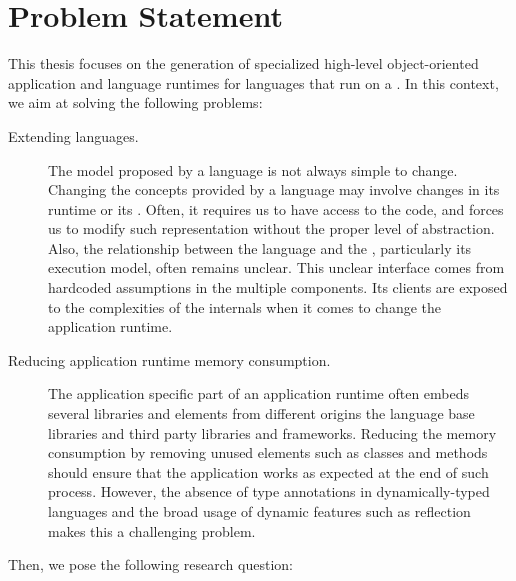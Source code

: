 \section{Problem Statement}

This thesis focuses on the generation of specialized high-level object-oriented application and language runtimes for languages that run on a \VM. In this context, we aim at solving the following problems:

\begin{description}

\item[Extending languages.] The model proposed by a language is not always simple to change. Changing the concepts provided by a language may involve changes in its runtime or its \VM. Often, it requires us to have access to the \VM code, and forces us to modify such representation without the proper level of abstraction. Also, the relationship between the language and the \VM, particularly its execution model, often remains unclear. This unclear interface comes from hardcoded assumptions in the multiple \VM components. Its clients are exposed to the complexities of the \VM internals when it comes to change the application runtime.

\item[Reducing application runtime memory consumption.] The application specific part of an application runtime often embeds several libraries and elements from different origins \eg the language base libraries and third party libraries and frameworks. Reducing the memory consumption by removing unused elements such as classes and methods should ensure that the application works as expected at the end of such process. However, the absence of type annotations in dynamically-typed languages and the broad usage of dynamic features such as reflection makes this a challenging problem.



\end{description}

\noindent Then, we pose the following research question:

